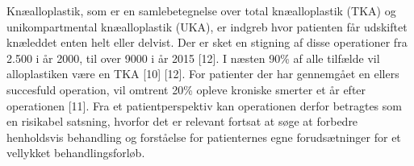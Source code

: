 Knæalloplastik, som er en samlebetegnelse over total knæalloplastik (TKA) og unikompartmental knæalloplastik (UKA), er indgreb hvor patienten får udskiftet knæleddet enten helt eller delvist. Der er sket en stigning af disse operationer fra 2.500 i år 2000, til over 9000 i år 2015 [12].  I næsten 90\% af alle tilfælde vil alloplastiken være en TKA [10] [12].
For patienter der har gennemgået en ellers succesfuld operation, vil omtrent 20\% opleve kroniske smerter et år efter operationen [11]. Fra et patientperspektiv kan operationen derfor betragtes som en risikabel satsning, hvorfor det er relevant fortsat at søge at forbedre henholdsvis behandling og forståelse for patienternes egne forudsætninger for et vellykket behandlingsforløb. 
